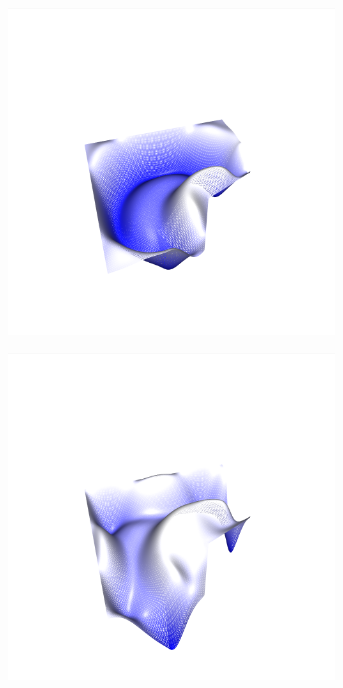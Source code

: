 \documentclass[crop=false,10pt,ngerman]{standalone}
\begin{document}
\begin{figure}[p]
        \begin{subfigure}[b]{0.24\textwidth}
          \center
          \includegraphics[trim={4cm 1.2cm 4.5cm 1.5cm},clip,width=0.95\textwidth]{images/test_wave_4.png}
          \caption{}
        \end{subfigure}
        \begin{subfigure}[b]{0.24\textwidth}
          \center
          \includegraphics[trim={4cm 1.2cm 4.5cm 1.5cm},clip,width=0.95\textwidth]{images/test_wave_5.png}

\end{subfigure}
\end{figure}
\end{document}
